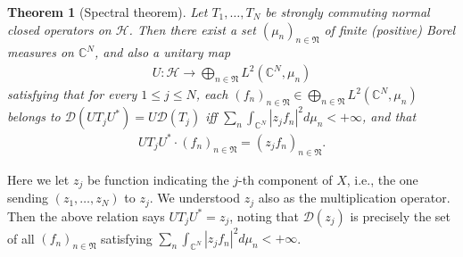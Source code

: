 \documentclass[12pt,a4paper,notitlepage]{article}
\theoremstyle{definition}
\theoremstyle{plain}
\newtheorem{thm}[df]{Theorem}
\newcommand{\fk}{\mathfrak}
\newcommand{\mc}{\mathcal}
\newcommand{\Dom}{\scr D}
\newcommand{\scr}{\mathscr}
\newcommand{\Cbb}{\mathbb C}
\numberwithin{equation}{section}
\begin{document}
\begin{thm}[Spectral theorem]\label{lb35}
Let $T_1,\dots,T_N$ be strongly commuting normal closed operators on $\mc H$. Then there exist a set $(\mu_n)_{n\in\fk N}$ of finite (positive) Borel measures on $\Cbb^N$, and also a unitary map
	\begin{align*}
		U:\mc H\rightarrow\bigoplus_{n\in\fk N} L^2(\Cbb^N,\mu_n)
	\end{align*}
	satisfying that for every $1\leq j\leq N$,  each $(f_n)_{n\in\fk N}\in \bigoplus_{n\in\fk N} L^2(\Cbb^N,\mu_n)$ belongs to $\Dom(UT_jU^*)=U\Dom(T_j)$ iff $\sum_n\int_{\Cbb^N}|z_jf_n|^2d\mu_n<+\infty$, and that
	\begin{align}
		UT_jU^*\cdot (f_n)_{n\in\fk N}=(z_jf_n)_{n\in\fk N}.
	\end{align}
\end{thm}
Here we let $z_j$ be function indicating the $j$-th component of $X$, i.e., the one sending $(z_1,\dots,z_N)$ to $z_j$. We understood $z_j$ also as the multiplication operator. Then the above relation says $UT_jU^*=z_j$, noting that $\Dom(z_j)$ is precisely the set of all $(f_n)_{n\in\fk N}$ satisfying $\sum_n\int_{\Cbb^N}|z_jf_n|^2d\mu_n<+\infty$.
\end{document}
